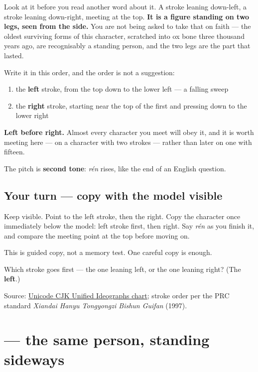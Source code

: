 Look at it before you read another word about it. A stroke leaning down-left, a stroke leaning down-right, meeting at the top. \textbf{It is a figure standing on two legs, seen from the side.} You are not being asked to take that on faith — the oldest surviving forms of this character, scratched into ox bone three thousand years ago, are recognisably a standing person, and the two legs are the part that lasted.

Write it in this order, and the order is not a suggestion:

\begin{enumerate}
\raggedright
  \item the \textbf{left} stroke, from the top down to the lower left — a falling sweep
  \item the \textbf{right} stroke, starting near the top of the first and pressing down to the lower right
\end{enumerate}

\textbf{Left before right.} Almost every character you meet will obey it, and it is worth meeting here — on a character with two strokes — rather than later on one with fifteen.

The pitch is \textbf{second tone}: \emph{rén} rises, like the end of an English question.

\subsection*{Your turn — copy with the model visible}
Keep \textbf{} visible. Point to the left stroke, then the right. Copy the character once immediately below the model: left stroke first, then right. Say \emph{rén} as you finish it, and compare the meeting point at the top before moving on.

This is guided copy, not a memory test. One careful copy is enough.

\begin{tcolorbox}[breakable,colback=teal!4,colframe=teal!35!black,title={Before you move on}]
Which stroke goes first — the one leaning left, or the one leaning right? (The \textbf{left}.)

Source: \href{https://www.unicode.org/charts/PDF/U4E00.pdf}{Unicode CJK Unified Ideographs chart}; stroke order per the PRC standard \emph{Xiandai Hanyu Tongyongzi Bishun Guifan} (1997).
\end{tcolorbox}
\section[\texorpdfstring{\zh{亻} (rén (as a component))}{亻 (rén (as a component))}]{ — the same person, standing sideways}

